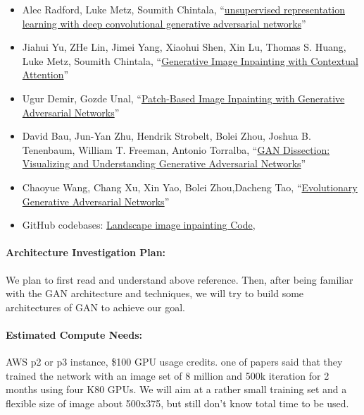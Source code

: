 \documentclass[11pt]{article}
\begin{document}
\begin{itemize} 
\item Alec Radford, Luke Metz, Soumith Chintala, ``\href{https://arxiv.org/pdf/1511.06434.pdf}{unsupervised representation learning with deep convolutional generative adversarial networks}'' 
\item Jiahui Yu, ZHe Lin, Jimei Yang, Xiaohui Shen, Xin Lu, Thomas S. Huang, Luke Metz, Soumith Chintala, ``\href{http://openaccess.thecvf.com/content_cvpr_2018/papers/Yu_Generative_Image_Inpainting_CVPR_2018_paper.pdf}{Generative Image Inpainting with Contextual Attention}'' 
\item Ugur Demir, Gozde Unal, ``\href{https://arxiv.org/pdf/1803.07422.pdf}{Patch-Based Image Inpainting with Generative Adversarial Networks}'' 
\item David Bau, Jun-Yan Zhu, Hendrik Strobelt, Bolei Zhou, Joshua B. Tenenbaum, William T. Freeman, Antonio Torralba, ``\href{https://arxiv.org/pdf/1811.10597.pdf}{GAN Dissection: Visualizing and Understanding Generative Adversarial Networks}'' 
\item Chaoyue Wang,  Chang Xu, Xin Yao, Bolei Zhou,Dacheng Tao, ``\href{https://arxiv.org/pdf/1803.00657.pdf}{Evolutionary Generative Adversarial Networks}'' 

\item GitHub codebases: \href{https://github.com/tron32213021/ee599-GAN-Project} {Landscape image inpainting Code},  
\end{itemize} 


\paragraph{Architecture Investigation Plan:}  We plan to first read and understand above reference. Then, after being familiar with the GAN architecture and techniques, we will try to build some architectures of GAN to achieve our goal.

\paragraph{Estimated Compute Needs:}  AWS p2 or p3 instance, \$100 GPU usage credits. one of papers said that they trained the network with an image set of 8 million and 500k iteration for 2 months using four K80 GPUs. We will aim at a rather small training set and a flexible size of image about 500x375, but still don't know total time to be used. 
\end{document}
